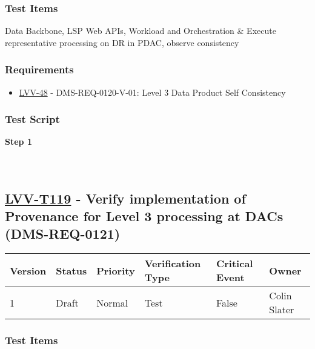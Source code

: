 \hypertarget{test-items-94}{%
\subsubsection{Test Items}\label{test-items-94}}

Data Backbone, LSP Web APIs, Workload and Orchestration \& Execute
representative processing on DR in PDAC, observe consistency

\hypertarget{requirements-95}{%
\subsubsection{Requirements}\label{requirements-95}}

\begin{itemize}
\tightlist
\item
  \href{https://jira.lsstcorp.org/browse/LVV-48}{LVV-48} -
  DMS-REQ-0120-V-01: Level 3 Data Product Self Consistency
\end{itemize}

\hypertarget{test-script-95}{%
\subsubsection{Test Script}\label{test-script-95}}

\textbf{Step 1}\\
~\\
~\\

\hypertarget{lvv-t119---verify-implementation-of-provenance-for-level-3-processing-at-dacs-dms-req-0121}{%
\subsection{\texorpdfstring{\href{https://jira.lsstcorp.org/secure/Tests.jspa\#/testCase/LVV-T119}{LVV-T119}
- Verify implementation of Provenance for Level 3 processing at DACs
(DMS-REQ-0121)}{LVV-T119 - Verify implementation of Provenance for Level 3 processing at DACs (DMS-REQ-0121)}}\label{lvv-t119---verify-implementation-of-provenance-for-level-3-processing-at-dacs-dms-req-0121}}

\begin{longtable}[]{@{}llllll@{}}
\toprule
Version & Status & Priority & Verification Type & Critical Event &
Owner\tabularnewline
\midrule
\endhead
1 & Draft & Normal & Test & False & Colin Slater\tabularnewline
\bottomrule
\end{longtable}

\hypertarget{test-items-95}{%
\subsubsection{Test Items}\label{test-items-95}}

